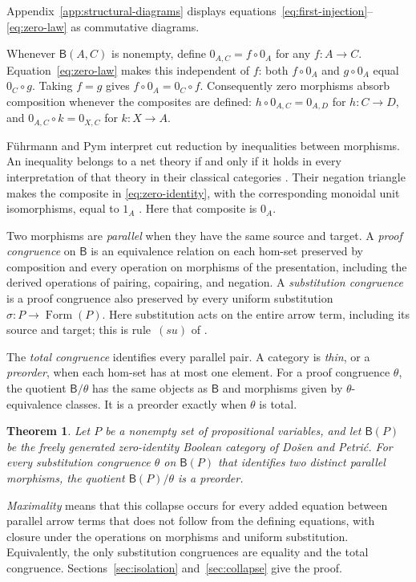 \documentclass[11pt]{article}
\newtheorem{theorem}{Theorem}[section]
\newcommand{\B}{\mathsf B}
\newcommand{\FormulaSet}{\operatorname{Form}}
\begin{document}
Appendix~\ref{app:structural-diagrams} displays
equations~\eqref{eq:first-injection}--\eqref{eq:zero-law}
as commutative diagrams.

Whenever $\B(A,C)$ is nonempty, define $0_{A,C}=f\circ0_A$ for any
$f:A\to C$. Equation~\eqref{eq:zero-law} makes this independent of
$f$: both $f\circ0_A$ and $g\circ0_A$ equal $0_C\circ g$.
Taking $f=g$ gives $f\circ0_A=0_C\circ f$. Consequently zero morphisms
absorb composition whenever the composites are defined:
$h\circ0_{A,C}=0_{A,D}$ for $h:C\to D$, and
$0_{A,C}\circ k=0_{X,C}$ for $k:X\to A$.

F\"uhrmann and Pym interpret cut reduction by inequalities between
morphisms. An inequality belongs to a net theory if and only if it
holds in every interpretation of that theory in their classical
categories \cite[Theorems~6.4--6.5]{FP}.
Their negation triangle makes the composite in
\eqref{eq:zero-identity}, with the corresponding monoidal unit
isomorphisms, equal to $1_A$ \cite[(11)]{FP}.
Here that composite is $0_A$.

Two morphisms are \emph{parallel} when they have the same source and
target. A \emph{proof congruence} on $\B$ is an equivalence relation
on each hom-set preserved by composition and every operation on morphisms
of the presentation, including the derived operations of pairing,
copairing, and negation.
A \emph{substitution congruence} is a proof congruence also preserved
by every uniform substitution $\sigma:P\to\FormulaSet(P)$.
Here substitution acts on the entire arrow term, including its source
and target; this is rule~$(su)$ of \cite[\S2.7, p.~51]{DP}.

The \emph{total congruence} identifies every parallel pair. A category
is \emph{thin}, or a \emph{preorder}, when each hom-set has at most one
element. For a proof congruence $\theta$, the quotient $\B/\theta$
has the same objects as $\B$ and morphisms given by $\theta$-equivalence
classes. It is a preorder exactly when $\theta$ is total.

\begin{theorem}\label{thm:main}
Let $P$ be a nonempty set of propositional variables, and let
$\B(P)$ be the freely generated zero-identity Boolean category of
Do\v{s}en and Petri\'c. For every substitution congruence $\theta$
on $\B(P)$ that identifies two distinct parallel morphisms, the
quotient $\B(P)/\theta$ is a preorder.
\end{theorem}

\emph{Maximality} means that this collapse occurs for every added
equation between parallel arrow terms that does not follow from the
defining equations, with closure under the operations on morphisms and
uniform substitution. Equivalently, the only substitution
congruences are equality and the total congruence.
Sections~\ref{sec:isolation} and~\ref{sec:collapse} give the proof.
\end{document}
